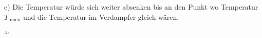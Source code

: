 e) Die Temperatur würde sich weiter absenken bis an den Punkt wo Temperatur $T_{\text{innen}}$ und die Temperatur im Verdampfer gleich wären.

```